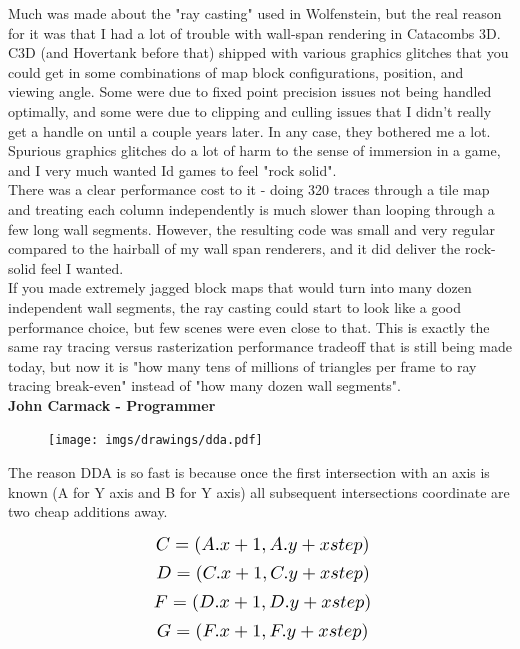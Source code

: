 \begin{fancyquotes}
\par
Much was made about the "ray casting" used in Wolfenstein, but the real reason for it was that I had a lot of trouble with wall-span rendering in Catacombs 3D.  C3D (and Hovertank before that) shipped with various graphics glitches that you could get in some combinations of map block configurations, position, and viewing angle.  Some were due to fixed point precision issues not being handled optimally, and some were due to clipping and culling issues that I didn't really get a handle on until a couple years later.  In any case, they bothered me a lot.  Spurious graphics glitches do a lot of harm to the sense of immersion in a game, and I very much wanted Id games to feel "rock solid".
 \bigskip \\
There was a clear performance cost to it - doing 320 traces through a tile map and treating each column independently is much slower than looping through a few long wall segments.  However, the resulting code was small and very regular compared to the hairball of my wall span renderers, and it did deliver the rock-solid feel I wanted.
 \bigskip \\
If you made extremely jagged block maps that would turn into many dozen independent wall segments, the ray casting could start to look like a good performance choice, but few scenes were even close to that.  This is exactly the same ray tracing versus rasterization performance tradeoff that is still being made today, but now it is "how many tens of millions of triangles per frame to ray tracing break-even" instead of "how many dozen wall segments".
 \bigskip \\
\textbf{John Carmack - Programmer}
 \end{fancyquotes}



 \par
\begin{figure}[H]
  \centering
 \texttt{[image: imgs/drawings/dda.pdf]}
\end{figure}
\par
The reason DDA is so fast is because once the first intersection with an axis is known (A for Y axis and B for Y axis) all subsequent intersections coordinate are two cheap additions away.
\par


\begin{equation*}
    \scalebox{1.3}{
$C = (A.x +1, A.y + xstep)$\\
}
\end{equation*}
\begin{equation*}
    \scalebox{1.3}{
$D = (C.x +1, C.y + xstep)$\\
}
\end{equation*}
\begin{equation*}
    \scalebox{1.3}{
$F = (D.x +1, D.y + xstep)$\\
}
\end{equation*}
\begin{equation*}
    \scalebox{1.3}{
$G = (F.x +1, F.y + xstep)$\\
}
\end{equation*}



